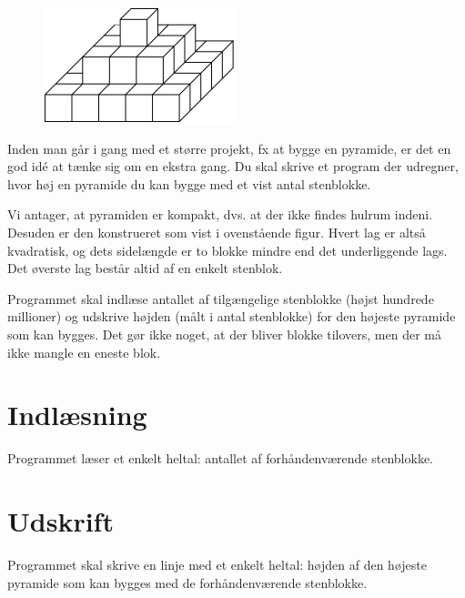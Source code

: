 
\begin{figure}[h!]
  \centering
  \includegraphics[scale=1.5]{pyramid}
\end{figure}

Inden man går i gang med et større projekt, fx at bygge en pyramide, er det en god idé at tænke sig om en ekstra gang.
Du skal skrive et program der udregner, hvor høj en pyramide du kan bygge med et vist antal stenblokke.

Vi antager, at pyramiden er kompakt, dvs. at der ikke findes hulrum indeni.
Desuden er den konstrueret som vist i ovenstående figur.
Hvert lag er altså kvadratisk, og dets sidelængde er to blokke mindre end det underliggende lags.
Det øverste lag består altid af en enkelt stenblok.

Programmet skal indlæse antallet af tilgængelige stenblokke (højst hundrede millioner) og udskrive højden (målt i antal stenblokke) for den højeste pyramide som kan bygges.
Det gør ikke noget, at der bliver blokke tilovers, men der må ikke mangle en eneste blok.

\section*{Indlæsning}
Programmet læser et enkelt heltal: antallet af forhåndenværende stenblokke.

\section*{Udskrift}
Programmet skal skrive en linje med et enkelt heltal: højden af den højeste pyramide som kan bygges med de forhåndenværende stenblokke.
